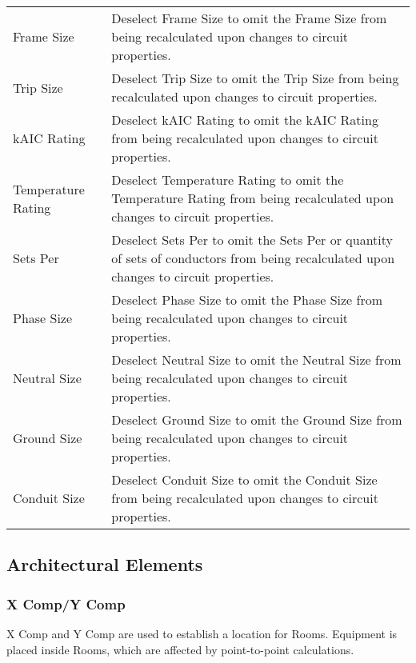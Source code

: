 \documentclass[letterpaper,10pt,english]{sphinxmanual}
\begin{document}
\begin{savenotes}\sphinxattablestart
\centering
\begin{tabulary}{\linewidth}[t]{|T|T|}
\hline
\sphinxstyletheadfamily 
{}
&\sphinxstyletheadfamily 
{}
\\
\hline
Frame Size
&
Deselect Frame Size to omit the Frame Size from being recalculated upon changes to circuit properties.
\\
\hline
Trip Size
&
Deselect Trip Size to omit the Trip Size from being recalculated upon changes to circuit properties.
\\
\hline
kAIC Rating
&
Deselect kAIC Rating to omit the kAIC Rating from being recalculated upon changes to circuit properties.
\\
\hline
Temperature Rating
&
Deselect Temperature Rating to omit the Temperature Rating from being recalculated upon changes to circuit properties.
\\
\hline
Sets Per
&
Deselect Sets Per to omit the Sets Per or quantity of sets of conductors from being recalculated upon changes to circuit properties.
\\
\hline
Phase Size
&
Deselect Phase Size to omit the Phase Size from being recalculated upon changes to circuit properties.
\\
\hline
Neutral Size
&
Deselect Neutral Size to omit the Neutral Size from being recalculated upon changes to circuit properties.
\\
\hline
Ground Size
&
Deselect Ground Size to omit the Ground Size from being recalculated upon changes to circuit properties.
\\
\hline
Conduit Size
&
Deselect Conduit Size to omit the Conduit Size from being recalculated upon changes to circuit properties.
\\
\hline
\end{tabulary}
\par
\sphinxattableend\end{savenotes}


\subsection{Architectural Elements}
\label{\detokenize{docs/definitions/index-definitions:architectural-elements}}\label{\detokenize{docs/definitions/index-definitions:architectural-elements-definitions}}

\subsubsection{X Comp/Y Comp}
\label{\detokenize{docs/definitions/index-definitions:x-comp-y-comp}}\label{\detokenize{docs/definitions/index-definitions:ycomp-definition}}\label{\detokenize{docs/definitions/index-definitions:xcomp-definition}}
X Comp and Y Comp are used to establish a location for Rooms.  Equipment is placed inside Rooms, which are affected by point-to-point calculations.
\end{document}
